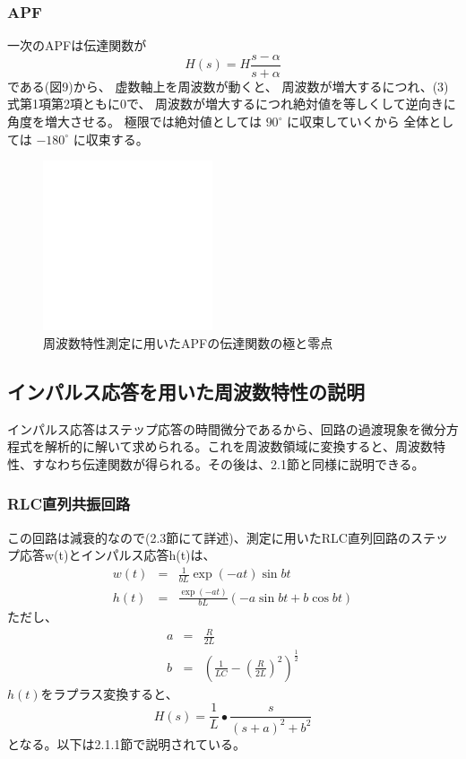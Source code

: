 \documentclass[10pt,a4j,dvipdfmx]{jsarticle}
\begin{document}
\subsubsection{APF}
一次のAPFは伝達関数が
\begin{equation}
H\left(s\right) = H \frac{s-\alpha}{s+\alpha}
\end{equation}
である(図9)から、
虚数軸上を周波数が動くと、
周波数が増大するにつれ、(3)式第1項第2項ともに0で、
周波数が増大するにつれ絶対値を等しくして逆向きに角度を増大させる。
極限では絶対値としては $90^{\circ}$ に収束していくから
全体としては $-180^{\circ}$ に収束する。
\begin{figure}[H]
  \centering
  \includegraphics[width=5cm]{token.png}
  \caption{周波数特性測定に用いたAPFの伝達関数の極と零点}
\end{figure}

\subsection{インパルス応答を用いた周波数特性の説明}
インパルス応答はステップ応答の時間微分であるから、回路の過渡現象を微分方程式を解析的に解いて求められる。これを周波数領域に変換すると、周波数特性、すなわち伝達関数が得られる。その後は、2.1節と同様に説明できる。

\subsubsection{RLC直列共振回路}
この回路は減衰的なので(2.3節にて詳述)、測定に用いたRLC直列回路のステップ応答w(t)とインパルス応答h(t)は、
\begin{eqnarray}
w(t) &=& \frac{1}{bL} \exp(-at)\sin bt \\
h(t) &=& \frac{\exp(-at)}{bL}\left( -a\sin bt + b\cos bt\right)
\end{eqnarray}
ただし、
\begin{eqnarray}
a &=& \frac{R}{2L} \\
b &=& \left( \frac{1}{LC}-\left(\frac{R}{2L}\right)^2\right)^{\frac{1}{2}}
\end{eqnarray}
$h(t)$をラプラス変換すると、
\begin{equation}
H\left(s\right) = \frac{1}{L}\bullet\frac{s}{\left(s+a\right)^{2}+b^{2}}
\end{equation}
となる。以下は2.1.1節で説明されている。
\end{document}
